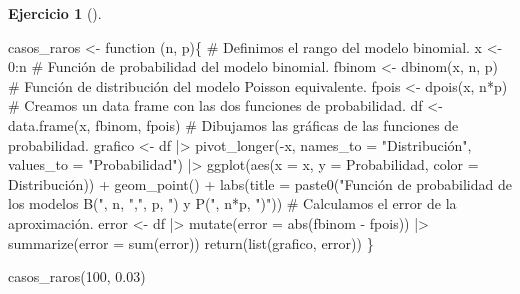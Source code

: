 \documentclass[
  a4paper,
]{scrreport}
\newenvironment{Shaded}{\begin{snugshade}}{\end{snugshade}}
\newcommand{\AttributeTok}[1]{\textcolor[rgb]{0.40,0.45,0.13}{#1}}
\newcommand{\CommentTok}[1]{\textcolor[rgb]{0.37,0.37,0.37}{#1}}
\newcommand{\ControlFlowTok}[1]{\textcolor[rgb]{0.00,0.23,0.31}{#1}}
\newcommand{\DecValTok}[1]{\textcolor[rgb]{0.68,0.00,0.00}{#1}}
\newcommand{\FloatTok}[1]{\textcolor[rgb]{0.68,0.00,0.00}{#1}}
\newcommand{\FunctionTok}[1]{\textcolor[rgb]{0.28,0.35,0.67}{#1}}
\newcommand{\NormalTok}[1]{\textcolor[rgb]{0.00,0.23,0.31}{#1}}
\newcommand{\OtherTok}[1]{\textcolor[rgb]{0.00,0.23,0.31}{#1}}
\newcommand{\SpecialCharTok}[1]{\textcolor[rgb]{0.37,0.37,0.37}{#1}}
\newcommand{\StringTok}[1]{\textcolor[rgb]{0.13,0.47,0.30}{#1}}
\theoremstyle{definition}
\newtheorem{exercise}{Ejercicio}[chapter]
\theoremstyle{remark}
\begin{document}
\begin{exercise}[]
\begin{enumerate}
\begin{tcolorbox}
\begin{Shaded}
\begin{Highlighting}[]
\NormalTok{casos\_raros }\OtherTok{\textless{}{-}} \ControlFlowTok{function}\NormalTok{ (n, p)\{}
    \CommentTok{\# Definimos el rango del modelo binomial.}
\NormalTok{    x }\OtherTok{\textless{}{-}} \DecValTok{0}\SpecialCharTok{:}\NormalTok{n}
    \CommentTok{\# Función de probabilidad del modelo binomial.}
\NormalTok{    fbinom }\OtherTok{\textless{}{-}} \FunctionTok{dbinom}\NormalTok{(x, n, p)}
    \CommentTok{\# Función de distribución del modelo Poisson equivalente.}
\NormalTok{    fpois }\OtherTok{\textless{}{-}} \FunctionTok{dpois}\NormalTok{(x, n}\SpecialCharTok{*}\NormalTok{p)}
    \CommentTok{\# Creamos un data frame con las dos funciones de probabilidad.}
\NormalTok{    df }\OtherTok{\textless{}{-}} \FunctionTok{data.frame}\NormalTok{(x, fbinom, fpois)}
    \CommentTok{\# Dibujamos las gráficas de las funciones de probabilidad.}
\NormalTok{    grafico }\OtherTok{\textless{}{-}}\NormalTok{ df  }\SpecialCharTok{|\textgreater{}} 
        \FunctionTok{pivot\_longer}\NormalTok{(}\SpecialCharTok{{-}}\NormalTok{x, }\AttributeTok{names\_to =} \StringTok{"Distribución"}\NormalTok{, }\AttributeTok{values\_to =} \StringTok{"Probabilidad"}\NormalTok{)  }\SpecialCharTok{|\textgreater{}} 
        \FunctionTok{ggplot}\NormalTok{(}\FunctionTok{aes}\NormalTok{(}\AttributeTok{x =}\NormalTok{ x, }\AttributeTok{y =}\NormalTok{ Probabilidad, }\AttributeTok{color =}\NormalTok{ Distribución)) }\SpecialCharTok{+} 
        \FunctionTok{geom\_point}\NormalTok{() }\SpecialCharTok{+}
        \FunctionTok{labs}\NormalTok{(}\AttributeTok{title =} \FunctionTok{paste0}\NormalTok{(}\StringTok{"Función de probabilidad de los modelos B("}\NormalTok{, n, }\StringTok{","}\NormalTok{, p, }\StringTok{") y P("}\NormalTok{, n}\SpecialCharTok{*}\NormalTok{p, }\StringTok{")"}\NormalTok{))}
    \CommentTok{\# Calculamos el error de la aproximación.}
\NormalTok{    error }\OtherTok{\textless{}{-}}\NormalTok{ df  }\SpecialCharTok{|\textgreater{}} 
        \FunctionTok{mutate}\NormalTok{(}\AttributeTok{error =} \FunctionTok{abs}\NormalTok{(fbinom }\SpecialCharTok{{-}}\NormalTok{ fpois))  }\SpecialCharTok{|\textgreater{}} 
        \FunctionTok{summarize}\NormalTok{(}\AttributeTok{error =} \FunctionTok{sum}\NormalTok{(error))}
    \FunctionTok{return}\NormalTok{(}\FunctionTok{list}\NormalTok{(grafico, error))}
\NormalTok{\}}

\FunctionTok{casos\_raros}\NormalTok{(}\DecValTok{100}\NormalTok{, }\FloatTok{0.03}\NormalTok{) }
\end{Highlighting}
\end{Shaded}


\end{tcolorbox}
\end{enumerate}
\end{exercise}
\end{document}
